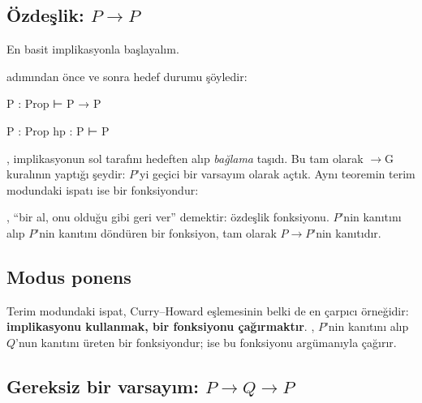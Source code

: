 \subsection{Özdeşlik: \texorpdfstring{$P \to P$}{P → P}}

En basit implikasyonla başlayalım.


\noindent {} adımından önce ve sonra hedef durumu şöyledir:

\begin{hedefgecisi}
\begin{hedefdurumu}[Önce]
P : Prop
⊢ P → P
\end{hedefdurumu}
\sonra
\begin{hedefdurumu}
P : Prop
hp : P
⊢ P
\end{hedefdurumu}
\end{hedefgecisi}

, implikasyonun sol tarafını hedeften alıp \emph{bağlama}
taşıdı. Bu tam olarak $\to$G kuralının yaptığı şeydir: $P$'yi geçici bir
varsayım olarak açtık. Aynı teoremin terim modundaki ispatı ise bir
fonksiyondur:


\noindent {}, ``bir  al, onu olduğu gibi geri ver''
demektir: özdeşlik fonksiyonu. $P$'nin kanıtını alıp $P$'nin kanıtını
döndüren bir fonksiyon, tam olarak $P \to P$'nin kanıtıdır.

\subsection{Modus ponens}


Terim modundaki ispat, Curry--Howard eşlemesinin belki de en çarpıcı
örneğidir: \textbf{implikasyonu kullanmak, bir fonksiyonu
çağırmaktır}. , $P$'nin kanıtını alıp $Q$'nun kanıtını üreten bir
fonksiyondur;  ise bu fonksiyonu  argümanıyla çağırır.

\subsection{Gereksiz bir varsayım: \texorpdfstring{$P \to Q \to P$}{P → Q → P}}

